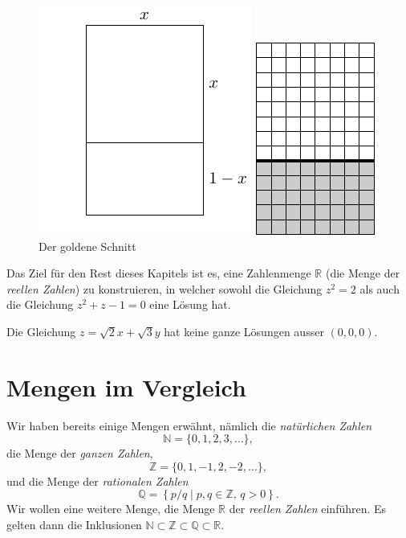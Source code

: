 \documentclass[../main.tex]{subfiles}
\begin{document}
\begin{figure}[htb] 
  \centering
  \begin{minipage}{0.35\textwidth}
    \centering
    \includegraphics{images/golden-ratio1}
  \end{minipage}%
  \begin{minipage}{0.35\textwidth}
    \centering
    \includegraphics{images/golden-ratio2}
  \end{minipage}%
  \caption{Der goldene Schnitt}%
  \label{fig:golden-ratio}
\end{figure}



Das Ziel für den Rest dieses Kapitels ist es, eine Zahlenmenge $\mathbb R$ (die Menge
der \emph{reellen Zahlen}) zu konstruieren, in welcher sowohl die Gleichung
$z^{2} = 2$ als auch die Gleichung $z^2 + z - 1 = 0$ eine Lösung hat.




\begin{exercise}
  Die Gleichung $z = \sqrt 2 x + \sqrt 3 y$ hat keine ganze Lösungen ausser $(0,0,0)$.
\end{exercise}

\section{Mengen im Vergleich}
Wir haben bereits einige Mengen erwähnt, nämlich die \emph{natürlichen Zahlen}
\[ \mathbb N = \{0, 1, 2, 3, \dots\},\]
die Menge der \emph{ganzen Zahlen},
\[ \mathbb Z = \{0, 1, -1, 2, -2, \dots\},\]
und die Menge der \emph{rationalen Zahlen}
\[ \mathbb Q = \left\{p/q \mid p, q \in \mathbb Z, \, q > 0\right\}.\]
Wir wollen eine weitere Menge, die Menge $\mathbb R$ der \emph{reellen Zahlen}
einführen. Es gelten dann die Inklusionen
\(\mathbb N \subset \mathbb Z \subset \mathbb Q \subset \mathbb R\).
\end{document}
